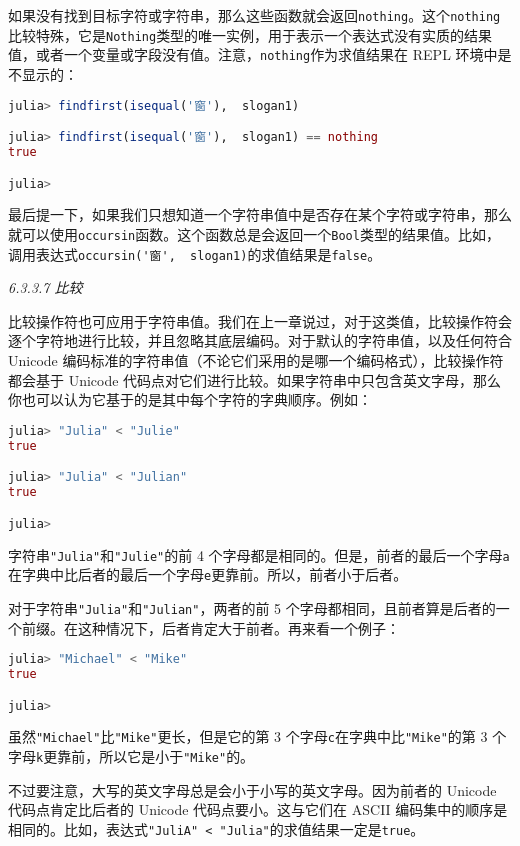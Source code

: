 如果没有找到目标字符或字符串，那么这些函数就会返回\verb`nothing`。这个\verb`nothing`比较特殊，它是\verb`Nothing`类型的唯一实例，用于表示一个表达式没有实质的结果值，或者一个变量或字段没有值。注意，\verb`nothing`作为求值结果在 REPL 环境中是不显示的：
\begin{lstlisting}[language=julia]
julia> findfirst(isequal('窗'),  slogan1) 

julia> findfirst(isequal('窗'),  slogan1) == nothing
true

julia> 
\end{lstlisting}

最后提一下，如果我们只想知道一个字符串值中是否存在某个字符或字符串，那么就可以使用\verb`occursin`函数。这个函数总是会返回一个\verb`Bool`类型的结果值。比如，调用表达式\verb`occursin('窗',  slogan1)`的求值结果是\verb`false`。

\textsl{6.3.3.7 比较}

比较操作符也可应用于字符串值。我们在上一章说过，对于这类值，比较操作符会逐个字符地进行比较，并且忽略其底层编码。对于默认的字符串值，以及任何符合 Unicode 编码标准的字符串值（不论它们采用的是哪一个编码格式），比较操作符都会基于 Unicode 代码点对它们进行比较。如果字符串中只包含英文字母，那么你也可以认为它基于的是其中每个字符的字典顺序。例如：
\begin{lstlisting}[language=julia]
julia> "Julia" < "Julie"
true

julia> "Julia" < "Julian" 
true

julia> 
\end{lstlisting}

字符串\verb`"Julia"`和\verb`"Julie"`的前 4 个字母都是相同的。但是，前者的最后一个字母\verb`a`在字典中比后者的最后一个字母\verb`e`更靠前。所以，前者小于后者。

对于字符串\verb`"Julia"`和\verb`"Julian"`，两者的前 5 个字母都相同，且前者算是后者的一个前缀。在这种情况下，后者肯定大于前者。再来看一个例子：
\begin{lstlisting}[language=julia]
julia> "Michael" < "Mike"
true

julia> 
\end{lstlisting}

虽然\verb`"Michael"`比\verb`"Mike"`更长，但是它的第 3 个字母\verb`c`在字典中比\verb`"Mike"`的第 3 个字母\verb`k`更靠前，所以它是小于\verb`"Mike"`的。

不过要注意，大写的英文字母总是会小于小写的英文字母。因为前者的 Unicode 代码点肯定比后者的 Unicode 代码点要小。这与它们在 ASCII 编码集中的顺序是相同的。比如，表达式\verb`"JuliA" < "Julia"`的求值结果一定是\verb`true`。

